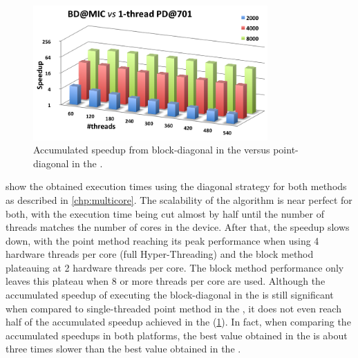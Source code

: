 \documentclass[../thesis]{subfiles}
\begin{document}
	\begin{figure}[t]
		\centering
		\begin{minipage}{0.7\textwidth}
			\centering
			\includegraphics[width=0.8\textwidth]{assets/images/mic/mic-cpu-speedup-accumulated.png}
			\captionsetup{font=small}
			\caption{Accumulated speedup from block-diagonal in the \intel\xeonphi versus point-diagonal in the \cpu.}
			\label{fig:mic:mic-cpu:speedup:accumulated}
		\end{minipage}
	\end{figure}

	 show the obtained execution times using the diagonal strategy for both methods as described in \cref{chp:multicore}. The scalability of the algorithm is near perfect for both, with the execution time being cut almost by half until the number of threads matches the number of cores in the device. After that, the speedup slows down, with the point method reaching its peak performance when using 4 hardware threads per core (full Hyper-Threading) and the block method plateauing at 2 hardware threads per core. The block method performance only leaves this plateau when 8 or more threads per core are used.
	Although the accumulated speedup of executing the block-diagonal in the \intel\xeonphi is still significant when compared to single-threaded point method in the \cpu, it does not even reach half of the accumulated speedup achieved in the \cpu (\cref{fig:mic:mic-cpu:speedup:accumulated}). In fact, when comparing the accumulated speedups in both platforms, the best value obtained in the \intel\xeonphi is about three times slower than the best value obtained in the \cpu.
\end{document}
